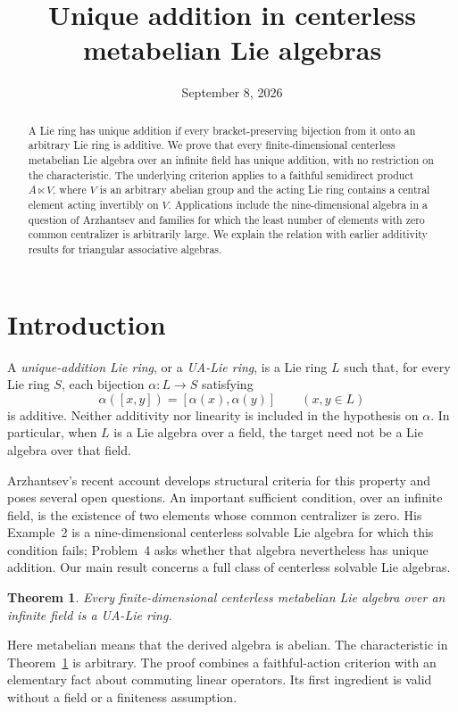 \documentclass[11pt]{article}
\title{Unique addition in centerless metabelian Lie algebras}
\author{}
\date{September 8, 2026}
\newtheorem{theorem}{Theorem}
\theoremstyle{definition}
\begin{document}
\maketitle
\begin{abstract}
A Lie ring has unique addition if every bracket-preserving bijection from it onto an arbitrary Lie ring is additive. We prove that every finite-dimensional centerless metabelian Lie algebra over an infinite field has unique addition, with no restriction on the characteristic. The underlying criterion applies to a faithful semidirect product $A\ltimes V$, where $V$ is an arbitrary abelian group and the acting Lie ring contains a central element acting invertibly on $V$. Applications include the nine-dimensional algebra in a question of Arzhantsev and families for which the least number of elements with zero common centralizer is arbitrarily large. We explain the relation with earlier additivity results for triangular associative algebras.
\end{abstract}


\section{Introduction}
A \emph{unique-addition Lie ring}, or a \emph{UA-Lie ring}, is a Lie ring $L$ such that, for every Lie ring $S$, each bijection $\alpha:L\to S$ satisfying
\[
 \alpha([x,y])=[\alpha(x),\alpha(y)]\qquad(x,y\in L)
\]
is additive. Neither additivity nor linearity is included in the hypothesis on $\alpha$. In particular, when $L$ is a Lie algebra over a field, the target need not be a Lie algebra over that field.

Arzhantsev's recent account \cite{Arz} develops structural criteria for this property and poses several open questions. An important sufficient condition, over an infinite field, is the existence of two elements whose common centralizer is zero. His Example~2 is a nine-dimensional centerless solvable Lie algebra for which this condition fails; Problem~4 asks whether that algebra nevertheless has unique addition. Our main result concerns a full class of centerless solvable Lie algebras.

\begin{theorem}\label{thm:main}
Every finite-dimensional centerless metabelian Lie algebra over an infinite field is a UA-Lie ring.
\end{theorem}

Here metabelian means that the derived algebra is abelian. The characteristic in Theorem~\ref{thm:main} is arbitrary. The proof combines a faithful-action criterion with an elementary fact about commuting linear operators. Its first ingredient is valid without a field or a finiteness assumption.
\end{document}
